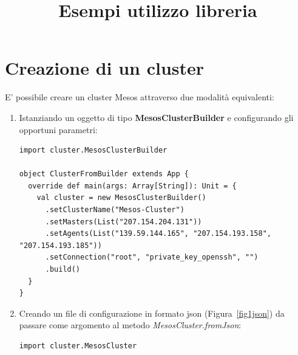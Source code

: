 \documentclass[12pt,a4paper]{article}
\title{Esempi utilizzo libreria}
\author{}
\date{}
\begin{document}
\maketitle

\section{Creazione di un cluster}\label{sec:creazioneCluster}
E' possibile creare un cluster Mesos attraverso due modalit\`a equivalenti:
\begin{enumerate}
\item Istanziando un oggetto di tipo \textbf{MesosClusterBuilder} e configurando gli opportuni parametri:
\begin{lstlisting}[style=myScalastyle]
import cluster.MesosClusterBuilder

object ClusterFromBuilder extends App {
  override def main(args: Array[String]): Unit = {
    val cluster = new MesosClusterBuilder()
      .setClusterName("Mesos-Cluster")
      .setMasters(List("207.154.204.131"))
      .setAgents(List("139.59.144.165", "207.154.193.158", "207.154.193.185"))
      .setConnection("root", "private_key_openssh", "")
      .build()
  }
}
\end{lstlisting}

  \item Creando un file di configurazione in formato json (Figura~\ref{fig1json}) da passare come argomento al metodo \textit{MesosCluster.fromJson}:
\begin{lstlisting}[style=myScalastyle]
 import cluster.MesosCluster
 

\end{lstlisting}
\end{enumerate}
\end{document}
